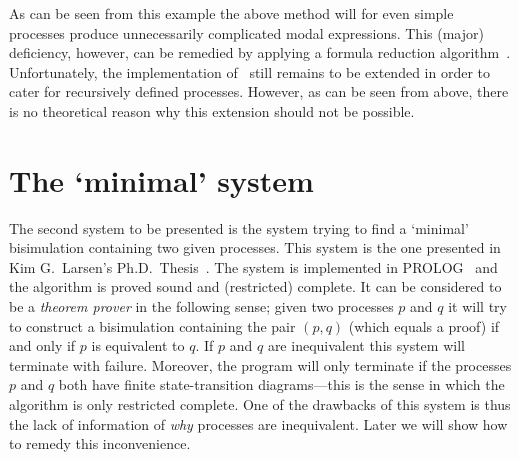 As can be seen from this example the above method will for even simple processes produce unnecessarily complicated modal expressions. This (major) deficiency, however, can be remedied by applying a formula reduction algorithm~\cite{VestmarOlesen}. Unfortunately, the implementation of~\cite{VestmarOlesen} still remains to be extended in order to cater for recursively defined processes. However, as can be seen from above, there is no theoretical reason why this extension should not be possible.


\section{The `minimal' system}
The second system to be presented is the system trying to find a `minimal' bisimulation containing two given processes. This system is the one presented in Kim G.~Larsen's Ph.D.~Thesis~\cite{Larsen}. The system is implemented in PROLOG~\cite{ClocksinMellish} and the algorithm is proved sound and (restricted) complete. It can be considered to be a {\em theorem prover\/} in the following sense; given two processes $p$ and $q$ it will try to construct a bisimulation containing the pair $(p,q)$ (which equals a proof) if and only if $p$ is equivalent to $q$. If $p$ and $q$ are inequivalent this system will terminate with failure. Moreover, the program will only terminate if the processes $p$ and $q$ both have finite state-transition diagrams---this is the sense in which the algorithm is only restricted complete. One of the drawbacks of this system  is thus the lack of information of {\em why\/} processes are inequivalent. Later we will show how to remedy this inconvenience.

